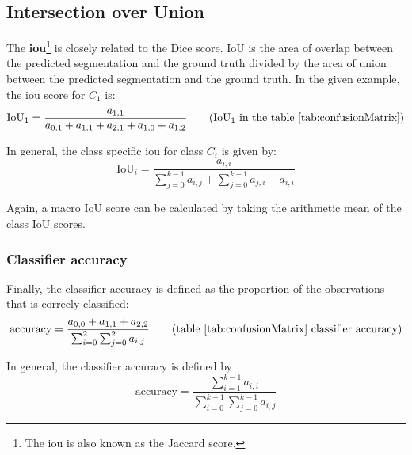 \subsection{Intersection over Union}

The \textbf{\acrfull{iou}}\footnote{The \acrshort{iou} is also known as the Jaccard score.} is closely related to the Dice score.
IoU is the area of overlap between the predicted segmentation and the ground truth divided by the area of union between the predicted segmentation and the ground truth.
In the given example, the \acrshort{iou} score for $C_1$ is:
\begin{equation}
    \text{IoU}_1 = \frac{a_{1,1}}{a_{0,1}+a_{1,1}+a_{2,1}+a_{1,0}+a_{1,2}} \tag{IoU$_1$ in the table \ref{tab:confusionMatrix}}
\end{equation}

In general, the class specific \acrfull{iou} for class $C_i$ is given by:
\begin{equation}
    \text{IoU}_i = \frac{a_{i,i}}{\sum_{j=0}^{k-1} a_{i, j} + \sum_{j=0}^{k-1} a_{j,i} - a_{i,i}} 
\end{equation}

Again, a macro IoU score can be calculated by taking the arithmetic mean of the class IoU scores.

\subsubsection{Classifier accuracy}

Finally, the classifier accuracy is defined as the proportion of the observations that is correcly classified:
\begin{equation}
    \text{accuracy} = \frac{a_{0,0} + a_{1,1} + a_{2,2}}{\sum_{i=0}^{2} \sum_{j=0}^{2} a_{i,j}   } \tag{table \ref{tab:confusionMatrix} classifier accuracy}
\end{equation}

In general, the classifier accuracy is defined by 
\begin{equation}
    \text{accuracy} = \frac{\sum_{i=1}^{k-1}a_{i,i}}{\sum_{i=0}^{k-1} \sum_{j=0}^{k-1} a_{i,j}   } 
\end{equation}


